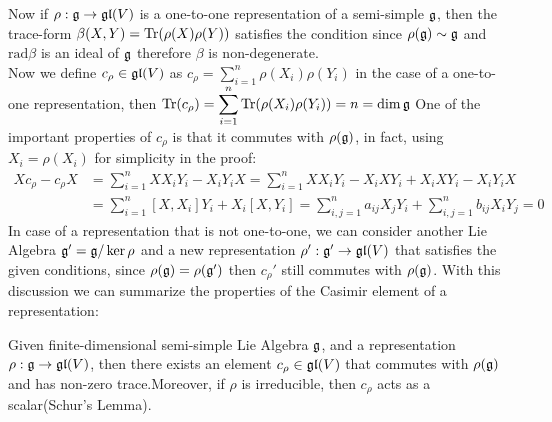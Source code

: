 Now if $\rho:\mathfrak{g} \rightarrow \mathfrak{gl}(V)$ is a one-to-one representation of a semi-simple $\mathfrak{g}$, then the trace-form $\beta(X,Y)=\text{Tr}(\rho(X)\rho(Y))$ satisfies the condition since $\rho(\mathfrak{g}) \sim \mathfrak{g}$ and $\text{rad} \beta$ is an ideal of $\mathfrak{g}$ therefore $\beta$ is non-degenerate.\\
Now we define $c_\rho \in \mathfrak{gl}(V)$ as $c_\rho = \displaystyle\sum_{i=1}^n \rho(X_i)\rho(Y_i)$ in the case of a one-to-one representation, then $\text{Tr}(c_\rho) = \displaystyle \sum_{i=1}^n\text{Tr}(\rho(X_i)\rho(Y_i))= n = \dim \mathfrak{g}$
One of the important properties of $c_\rho$ is that it commutes with $\rho(\mathfrak{g})$, in fact, using $X_i=\rho(X_i)$ for simplicity in the proof:
\begin{align*}
Xc_\rho - c_\rho X &= \sum_{i=1}^n XX_iY_i - X_iY_iX = \sum_{i=1}^nXX_iY_i - X_iXY_i + X_iXY_i - X_iY_iX  \\
&=  \sum_{i=1}^n [X,X_i]Y_i + X_i[X,Y_i] = \sum_{i,j=1}^n a_{ij}X_jY_i + \sum_{i,j=1}^n b_{ij}X_iY_j = 0
\end{align*}
In case of a representation that is not one-to-one, we can consider another Lie Algebra $\mathfrak{g}'=\mathfrak{g}/\ker \rho$ and a new representation $\rho': \mathfrak{g}' \rightarrow \mathfrak{gl}(V)$ that satisfies the given conditions, since $\rho(\mathfrak{g})=\rho(\mathfrak{g}')$ then $c_\rho'$ still commutes with $\rho(\mathfrak{g})$.
With this discussion we can summarize the properties of the Casimir element of a representation:
\begin{prop}
Given finite-dimensional semi-simple Lie Algebra $\mathfrak{g}$, and a representation $\rho:\mathfrak{g}\rightarrow \mathfrak{gl}(V)$, then there exists an element $c_\rho \in \mathfrak{gl}(V)$ that commutes with $\rho(\mathfrak{g})$ and has non-zero trace.Moreover, if $\rho$ is irreducible, then $c_\rho$ acts as a scalar(Schur's Lemma).
\end{prop}
